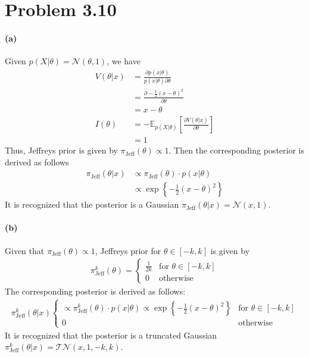 \section{Problem 3.10}
\paragraph{(a)}
Given $p(X \vert \theta) = \mathcal{N}(\theta, 1)$, we have
\begin{align*}
    V(\theta \vert x) 
    &= \frac{\partial p(x \vert \theta)}{p(x \vert \theta) \partial \theta}\\
    &= \frac {\partial -\frac{1}{2}(x - \theta)^2} {\partial \theta}\\
    &= x - \theta\\
    I(\theta) 
    &= -\mathbb{E}_{p(X \vert \theta)} \left[ \frac{\partial V(\theta \vert x)}{\partial \theta}\right]\\
    &= 1
\end{align*}
Thus, Jeffreys prior is given by $\pi_\mathrm{Jeff}(\theta) \propto 1$. Then the corresponding posterior is derived as follows
\begin{align*}
    \pi_\mathrm{Jeff} (\theta \vert x)
    &\propto \pi_\mathrm{Jeff} (\theta) \cdot p(x \vert \theta)\\
    &\propto \exp \left\{ -\frac{1}{2} (x - \theta)^2 \right\}
\end{align*}
It is recognized that the posterior is a Gaussian $\pi_\mathrm{Jeff} (\theta \vert x) = \mathcal{N}(x, 1)$.

\paragraph{(b)}
Given that $\pi_\mathrm{Jeff}(\theta) \propto 1$, Jeffreys prior for $\theta \in [-k, k ]$ is given by
\begin{align*}
    \pi^k_\mathrm{Jeff}(\theta) = 
    \begin{cases}
        \frac{1}{2k} & \text{for }\theta \in [-k, k]\\
        0 & \text{otherwise}
    \end{cases}
\end{align*}
The corresponding posterior is derived as follows:
\begin{align*}
    \pi_\mathrm{Jeff}^k (\theta \vert x)
    \begin{cases}
        \propto \pi_\mathrm{Jeff}^k (\theta) \cdot p(x \vert \theta)
        \propto \exp \left\{ -\frac{1}{2} (x - \theta)^2 \right\}
        &  \text{for }\theta \in [-k, k]\\
        0 & \text{otherwise}
    \end{cases}
\end{align*}
It is recognized that the posterior is a truncated Gaussian $\pi_\mathrm{Jeff}^k (\theta \vert x) = \mathcal{TN}(x, 1, -k, k)$.

